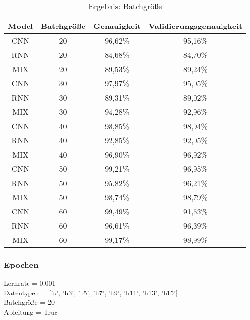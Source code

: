     \begin{table}[H]
        \centering
        \begin{tabular}{|c|c|c|c|}
            \hline
            Model & Batchgröße & Genauigkeit & Validierungsgenauigkeit \\
            \hline
            CNN & 20 & 96,62\% & 95,16\% \\
            \hline
            RNN & 20 & 84,68\% & 84,70\% \\ 
            \hline
            MIX & 20 & 89,53\% & 89,24\% \\ 
            \hline
            \hline
            CNN & 30 & 97,97\% & 95,05\% \\ 
            \hline
            RNN & 30 & 89,31\% & 89,02\% \\ 
            \hline
            MIX & 30 & 94,28\% & 92,96\% \\ 
            \hline
            \hline
            CNN & 40 & 98,85\% & 98,94\% \\ 
            \hline
            RNN & 40 & 92,85\% & 92,05\% \\
            \hline
            MIX & 40 & 96,90\% & 96,92\% \\ 
            \hline
            \hline
            CNN & 50 & 99,21\% & 96,95\% \\ 
            \hline
            RNN & 50 & 95,82\% & 96,21\% \\ 
            \hline
            MIX & 50 & 98,74\% & 98,79\% \\ 
            \hline
            \hline
            CNN & 60 & 99,49\% & 91,63\% \\ 
            \hline
            RNN & 60 & 96,61\% & 96,39\% \\ 
            \hline
            MIX & 60 & 99,17\% & 98,99\% \\
            \hline
        \end{tabular}
        \caption{Ergebnis: Batchgröße}
        \label{tabl:ErgebnisBatchsize}
    \end{table}

    \subsubsection{Epochen}

    Lernrate = 0.001\\
    \noindent
    Datentypen = ['u', 'h3', 'h5', 'h7', 'h9', 'h11', 'h13', 'h15']\\
    \noindent
    Batchgröße = 20\\
    \noindent
    Ableitung = True\\

